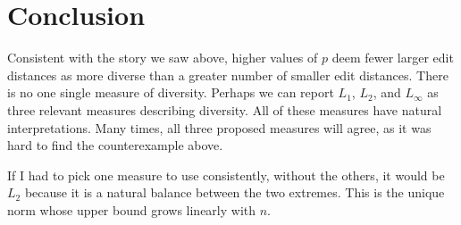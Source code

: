 \documentclass{article}
\begin{document}
\section{Conclusion}

Consistent with the story we saw above, higher values of $p$ deem
fewer larger edit distances as more diverse than a greater number of
smaller edit distances.  There is no one single measure of diversity.
Perhaps we can report $L_1$, $L_2$, and $L_\infty$ as three relevant
measures describing diversity.  All of these measures have natural
interpretations.  Many times, all three proposed measures will agree,
as it was hard to find the counterexample above.

If I had to pick one measure to use consistently, without the others,
it would be $L_2$ because it is a natural balance between the two
extremes.  This is the unique norm whose upper bound grows linearly
with $n$.
\end{document}
